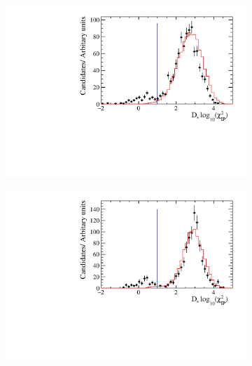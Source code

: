 \begin{figure}[!h]
   \centering
   \begin{subfigure}[t]{0.32\textwidth}
      \centering
      \includegraphics[width=1.0\textwidth]{figs/Selection/Data_MC_Comparison_Var_2_B2DsPhi_Ds2KKPi.pdf}
      \caption{\decay{\Dsp}{\Kp\Km\pip}}
   \end{subfigure}
   \begin{subfigure}[t]{0.32\textwidth}
      \centering
      \includegraphics[width=1.0\textwidth]{figs/Selection/Data_MC_Comparison_Var_2_B2DsPhi_Ds2PiPiPi.pdf}
      \caption{\decay{\Dsp}{\pip\pim\pip}}
   \end{subfigure}
   \begin{subfigure}[t]{0.32\textwidth}
      \centering

\end{subfigure}
\end{figure}
